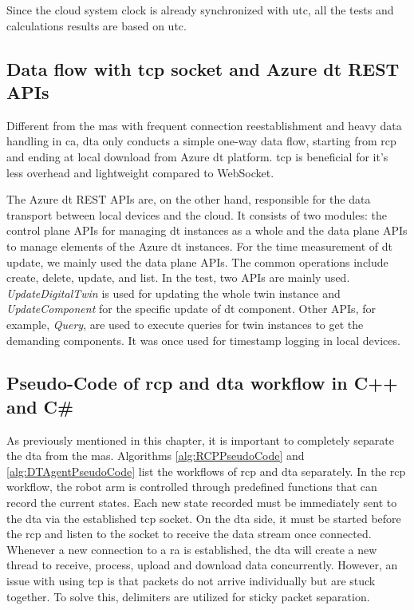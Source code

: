 Since the cloud system clock is already synchronized with \gls{utc}, all the tests and calculations results are based on \gls{utc}. 

\subsection{Data flow with \gls{tcp} socket and Azure \gls{dt} REST APIs}\label{chap: RCPTCP-DTAPI}
Different from the \gls{mas} with frequent connection reestablishment and heavy data handling in \gls{ca}, 
\gls{dta} only conducts a simple one-way data flow, starting from \gls{rcp} and 
ending at local download from Azure \gls{dt} platform. \gls{tcp} is beneficial for 
it's less overhead and lightweight compared to WebSocket. 


The Azure \gls{dt} REST APIs are, on the other hand, responsible for the data 
transport between local devices and the cloud. It consists of two modules: the 
control plane APIs for managing \gls{dt} instances as a whole and the 
data plane APIs to manage elements of the Azure \gls{dt} instances. For the 
time measurement of \gls{dt} update, we mainly used the data plane APIs. The 
common operations include create, delete, update, and list. In the test, two 
APIs are mainly used. \textit{UpdateDigitalTwin} is used for updating 
the whole twin instance 
and \textit{UpdateComponent} for the specific update of \gls{dt} component. 
Other APIs, for example, \textit{Query}, are used to execute queries for twin 
instances to get the demanding components. It was once used for timestamp 
logging in local devices. 

\subsection{Pseudo-Code of \gls{rcp} and \gls{dta} workflow in C++ and C\#}\label{chap: RCPDTAPseudo}

As previously mentioned in this chapter, it is important to completely separate the 
\gls{dta} from the \gls{mas}. Algorithms \ref{alg:RCPPseudoCode} and 
\ref{alg:DTAgentPseudoCode} list the workflows of \gls{rcp} and \gls{dta} separately. 
In the \gls{rcp} workflow, the robot arm is controlled through predefined functions 
that can record the current states. Each new state recorded must be immediately sent 
to the \gls{dta} via the established \gls{tcp} socket. 
On the \gls{dta} side, it must be started before the \gls{rcp} and listen to the 
socket to receive the data stream once connected. Whenever a new connection to a 
\gls{ra} is established, the \gls{dta} will create a new thread to receive, process, 
upload and download data concurrently. 
However, an issue with using \gls{tcp} is that packets do not arrive individually 
but are stuck together. To solve this, delimiters are utilized for sticky packet separation.

